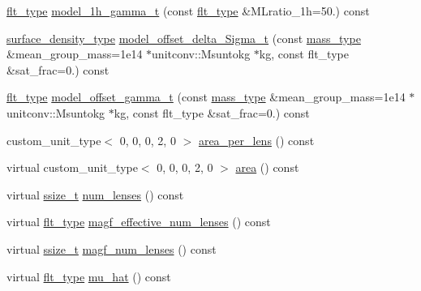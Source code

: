 \begin{DoxyCompactItemize}
\item 
\hyperlink{lib_2IceBRG__main_2common_8h_ad0f130a56eeb944d9ef2692ee881ecc4}{flt\-\_\-type} \hyperlink{classIceBRG_1_1pair__bin__summary_ae0e5c883d7c00ffcd745c9b53e9fcc70}{model\-\_\-1h\-\_\-gamma\-\_\-t} (const \hyperlink{lib_2IceBRG__main_2common_8h_ad0f130a56eeb944d9ef2692ee881ecc4}{flt\-\_\-type} \&M\-Lratio\-\_\-1h=50.) const 
\item 
\hyperlink{namespaceIceBRG_a80c597ef5ba0a32491d32a9f0083b02d}{surface\-\_\-density\-\_\-type} \hyperlink{classIceBRG_1_1pair__bin__summary_a9b5aa9cbf8b82c11c9e70b585149bb47}{model\-\_\-offset\-\_\-delta\-\_\-\-Sigma\-\_\-t} (const \hyperlink{namespaceIceBRG_a1be72ac4918a9b029f2eefa084213e35}{mass\-\_\-type} \&mean\-\_\-group\-\_\-mass=1e14 $\ast$unitconv\-::\-Msuntokg $\ast$kg, const flt\-\_\-type \&sat\-\_\-frac=0.) const 
\item 
\hyperlink{lib_2IceBRG__main_2common_8h_ad0f130a56eeb944d9ef2692ee881ecc4}{flt\-\_\-type} \hyperlink{classIceBRG_1_1pair__bin__summary_a2f539a8860a38bee4e54bdc27f53faaa}{model\-\_\-offset\-\_\-gamma\-\_\-t} (const \hyperlink{namespaceIceBRG_a1be72ac4918a9b029f2eefa084213e35}{mass\-\_\-type} \&mean\-\_\-group\-\_\-mass=1e14 $\ast$unitconv\-::\-Msuntokg $\ast$kg, const flt\-\_\-type \&sat\-\_\-frac=0.) const 
\item 
custom\-\_\-unit\-\_\-type$<$ 0, 0, 0, 2, 0 $>$ \hyperlink{classIceBRG_1_1pair__bin__summary_a556037a76b545b5a453595d30fdd94a6}{area\-\_\-per\-\_\-lens} () const 
\item 
virtual custom\-\_\-unit\-\_\-type$<$ 0, 0, 0, 2, 0 $>$ \hyperlink{classIceBRG_1_1pair__bin__summary_a6c0d9413d2cab3f09e96947dc08b6841}{area} () const 
\item 
virtual \hyperlink{lib_2IceBRG__main_2common_8h_ab322a3e50421dc5f0c43316b1b373592}{ssize\-\_\-t} \hyperlink{classIceBRG_1_1pair__bin__summary_a36cfa054426945727a7638c7831a7f04}{num\-\_\-lenses} () const 
\item 
virtual \hyperlink{lib_2IceBRG__main_2common_8h_ad0f130a56eeb944d9ef2692ee881ecc4}{flt\-\_\-type} \hyperlink{classIceBRG_1_1pair__bin__summary_a71592ca23d56860395e8fe22335098ff}{magf\-\_\-effective\-\_\-num\-\_\-lenses} () const 
\item 
virtual \hyperlink{lib_2IceBRG__main_2common_8h_ab322a3e50421dc5f0c43316b1b373592}{ssize\-\_\-t} \hyperlink{classIceBRG_1_1pair__bin__summary_a1df27276f9953ae8f6d25dabadcb563d}{magf\-\_\-num\-\_\-lenses} () const 
\item 
virtual \hyperlink{lib_2IceBRG__main_2common_8h_ad0f130a56eeb944d9ef2692ee881ecc4}{flt\-\_\-type} \hyperlink{classIceBRG_1_1pair__bin__summary_ab594afbd4f1d079ae155402c96a96a5c}{mu\-\_\-hat} () const 

\end{DoxyCompactItemize}
